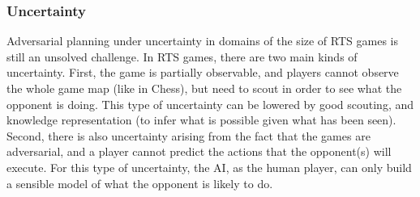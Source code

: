 \documentclass[journal]{IEEEtran}
\begin{document}

\subsubsection{Uncertainty}
Adversarial planning under uncertainty in domains of the size of RTS games is still an unsolved challenge.
In RTS games, there are two main kinds of uncertainty. First, the game is partially observable, and players cannot observe the whole game map (like in Chess), but need to scout in order to see what the opponent is doing. This type of uncertainty can be lowered by good scouting, and knowledge representation (to infer what is possible given what has been seen). Second, there is also uncertainty arising from the fact that the games are adversarial, and a player cannot predict the actions that the opponent(s) will execute. For this type of uncertainty, the AI, as the human player, can only build a sensible model of what the opponent is likely to do. 
\end{document}
